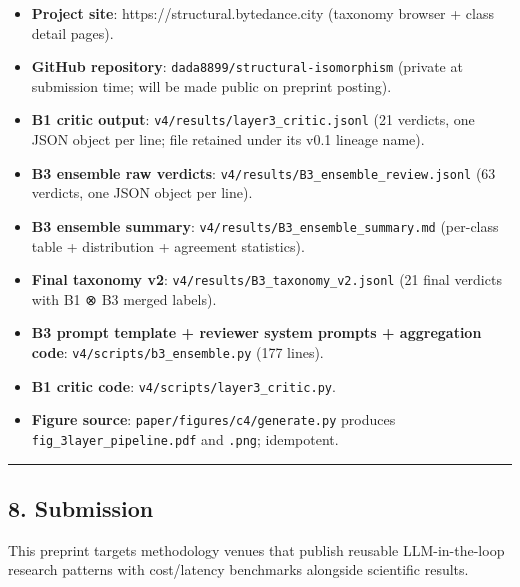 \documentclass[
  letterpaper,
  11pt]{article}
\providecommand{\tightlist}{%
  \setlength{\itemsep}{0pt}\setlength{\parskip}{0pt}}
\begin{document}
\begin{itemize}
\tightlist
\item
  \textbf{Project site}: https://structural.bytedance.city (taxonomy
  browser + class detail pages).
\item
  \textbf{GitHub repository}: \texttt{dada8899/structural-isomorphism}
  (private at submission time; will be made public on preprint posting).
\item
  \textbf{B1 critic output}: \texttt{v4/results/layer3\_critic.jsonl}
  (21 verdicts, one JSON object per line; file retained under its v0.1
  lineage name).
\item
  \textbf{B3 ensemble raw verdicts}:
  \texttt{v4/results/B3\_ensemble\_review.jsonl} (63 verdicts, one JSON
  object per line).
\item
  \textbf{B3 ensemble summary}:
  \texttt{v4/results/B3\_ensemble\_summary.md} (per-class table +
  distribution + agreement statistics).
\item
  \textbf{Final taxonomy v2}: \texttt{v4/results/B3\_taxonomy\_v2.jsonl}
  (21 final verdicts with B1 ⊗ B3 merged labels).
\item
  \textbf{B3 prompt template + reviewer system prompts + aggregation
  code}: \texttt{v4/scripts/b3\_ensemble.py} (177 lines).
\item
  \textbf{B1 critic code}: \texttt{v4/scripts/layer3\_critic.py}.
\item
  \textbf{Figure source}: \texttt{paper/figures/c4/generate.py} produces
  \texttt{fig\_3layer\_pipeline.pdf} and \texttt{.png}; idempotent.
\end{itemize}

\begin{center}\rule{0.5\linewidth}{0.5pt}\end{center}

\subsection{8. Submission}\label{submission}

This preprint targets methodology venues that publish reusable
LLM-in-the-loop research patterns with cost/latency benchmarks alongside
scientific results.
\end{document}

